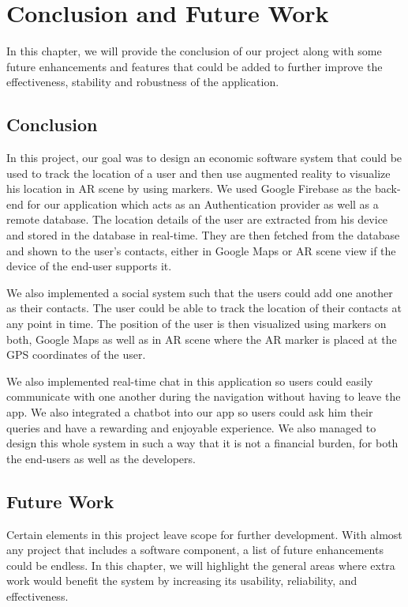 \chapter{Conclusion and Future Work} 
\label{chap5}

In this chapter, we will provide the conclusion of our project along with some future enhancements and features that could be added to further improve the effectiveness, stability and robustness of the application.

\section{Conclusion}
In this project, our goal was to design an economic software system that could be used to track the location of a user and then use augmented reality to visualize his location in AR scene by using markers. We used Google Firebase as the back-end for our application which acts as an Authentication provider as well as a remote database. The location details of the user are extracted from his device and stored in the database in real-time. They are then fetched from the database and shown to the user's contacts, either in Google Maps or AR scene view if the device of the end-user supports it.

We also implemented a social system such that the users could add one another as their contacts. The user could be able to track the location of their contacts at any point in time. The position of the user is then visualized using markers on both, Google Maps as well as in AR scene where the AR marker is placed at the GPS coordinates of the user. 

We also implemented real-time chat in this application so users could easily communicate with one another during the navigation without having to leave the app. We also integrated a chatbot into our app so users could ask him their queries and have a rewarding and enjoyable experience. We also managed to design this whole system in such a way that it is not a financial burden, for both the end-users as well as the developers.


\section{Future Work}
Certain elements in this project leave scope for further development. With almost any project that includes a software component, a list of future enhancements could be endless. In this chapter, we will highlight the general areas where extra work would benefit the system by increasing its usability, reliability, and effectiveness.

